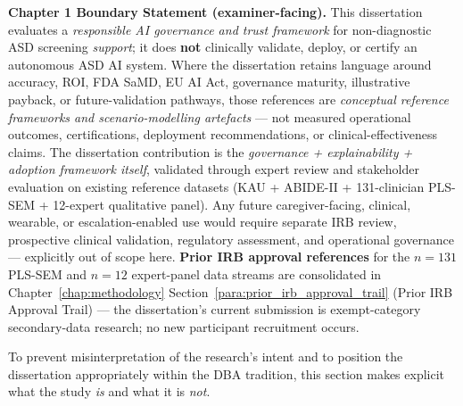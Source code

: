 \noindent\textbf{Chapter 1 Boundary Statement (examiner-facing).}
\label{para:ch1_boundary_statement}
This dissertation evaluates a \emph{responsible AI governance and trust framework} for non-diagnostic ASD screening \emph{support}; it does \textbf{not} clinically validate, deploy, or certify an autonomous ASD AI system. Where the dissertation retains language around accuracy, ROI, FDA SaMD, EU AI Act, governance maturity, illustrative payback, or future-validation pathways, those references are \emph{conceptual reference frameworks and scenario-modelling artefacts} --- not measured operational outcomes, certifications, deployment recommendations, or clinical-effectiveness claims. The dissertation contribution is the \emph{governance + explainability + adoption framework itself}, validated through expert review and stakeholder evaluation on existing reference datasets (KAU + ABIDE-II + 131-clinician PLS-SEM + 12-expert qualitative panel). Any future caregiver-facing, clinical, wearable, or escalation-enabled use would require separate IRB review, prospective clinical validation, regulatory assessment, and operational governance --- explicitly out of scope here. \textbf{Prior IRB approval references} for the $n{=}131$ PLS-SEM and $n{=}12$ expert-panel data streams are consolidated in Chapter~\ref{chap:methodology} Section~\ref{para:prior_irb_approval_trail} (Prior IRB Approval Trail) --- the dissertation's current submission is exempt-category secondary-data research; no new participant recruitment occurs.

To prevent misinterpretation of the research's intent and to position the dissertation appropriately within the DBA tradition, this section makes explicit what the study \emph{is} and what it is \emph{not}.

